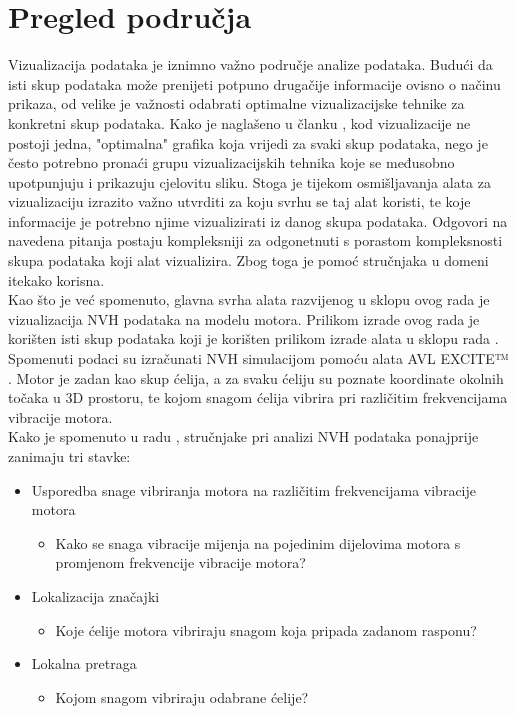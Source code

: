 \documentclass[times, utf8, diplomski]{fer}
\begin{document}
\chapter{Pregled područja}
Vizualizacija podataka je iznimno važno područje analize podataka. Budući da isti skup podataka može prenijeti potpuno drugačije informacije ovisno o načinu prikaza, od velike je važnosti odabrati optimalne vizualizacijske tehnike za konkretni skup podataka. Kako je naglašeno u članku \citep{Unwin2020Why}, kod vizualizacije ne postoji jedna, "optimalna" grafika koja vrijedi za svaki skup podataka, nego je često potrebno pronaći grupu vizualizacijskih tehnika koje se međusobno upotpunjuju i prikazuju cjelovitu sliku. Stoga je tijekom osmišljavanja alata za vizualizaciju izrazito važno utvrditi za koju svrhu se taj alat koristi, te koje informacije je potrebno njime vizualizirati iz danog skupa podataka. Odgovori na navedena pitanja postaju kompleksniji za odgonetnuti s porastom kompleksnosti skupa podataka koji alat vizualizira. Zbog toga je pomoć stručnjaka u domeni itekako korisna.\\

Kao što je već spomenuto, glavna svrha alata razvijenog u sklopu ovog rada je vizualizacija NVH podataka na modelu motora. Prilikom izrade ovog rada je korišten isti skup podataka koji je korišten prilikom izrade alata u sklopu rada \citep{matkovic2021getting}. Spomenuti podaci su izračunati NVH simulacijom pomoću alata AVL EXCITE™ \citep{avlEXCITE}. Motor je zadan kao skup ćelija, a za svaku ćeliju su poznate koordinate okolnih točaka u 3D prostoru, te kojom snagom ćelija vibrira pri različitim frekvencijama vibracije motora.\\

Kako je spomenuto u radu \citep{matkovic2021getting}, stručnjake pri analizi NVH podataka ponajprije zanimaju tri stavke:

\begin{itemize}
\item Usporedba snage vibriranja motora na različitim frekvencijama vibracije motora
	\begin{itemize}
	\item Kako se snaga vibracije mijenja na pojedinim dijelovima motora s promjenom frekvencije vibracije motora?
	\end{itemize} 
\item Lokalizacija značajki
	\begin{itemize}
	\item Koje ćelije motora vibriraju snagom koja pripada zadanom rasponu?
	\end{itemize} 
\item Lokalna pretraga
	\begin{itemize}
	\item Kojom snagom vibriraju odabrane ćelije?\\
	\end{itemize} 
\end{itemize}
\end{document}

